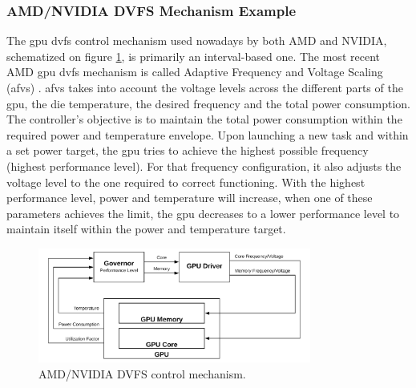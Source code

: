 \subsubsection{AMD/NVIDIA DVFS Mechanism Example}

The \acrshort{gpu} \acrshort{dvfs} control mechanism used nowadays by both AMD and NVIDIA, schematized on figure \ref{fig:DVFSmechanism}, is primarily an interval-based one. The most recent AMD \acrshort{gpu} \acrshort{dvfs} mechanism is called Adaptive Frequency and Voltage Scaling (\acrshort{afvs}) \cite{amd_polaris_2017}. \acrshort{afvs} takes into account the voltage levels across the different parts of the \acrshort{gpu}, the die temperature, the desired frequency and the total power consumption. The controller's objective is to maintain the total power consumption within the required power and temperature envelope. Upon launching a new task and within a set power target, the \acrshort{gpu} tries to achieve the highest possible frequency (highest performance level). For that frequency configuration, it also adjusts the voltage level to the one required to correct functioning. With the highest performance level, power and temperature will increase, when one of these parameters achieves the limit, the \acrshort{gpu} decreases to a lower performance level to maintain itself within the power and temperature target. 

\begin{figure}[!htb]
  \centering
  \includegraphics[width=0.8\textwidth]{Figures/Background/DVFS.png}
  \caption{AMD/NVIDIA DVFS control mechanism.}
  \label{fig:DVFSmechanism}
\end{figure}

